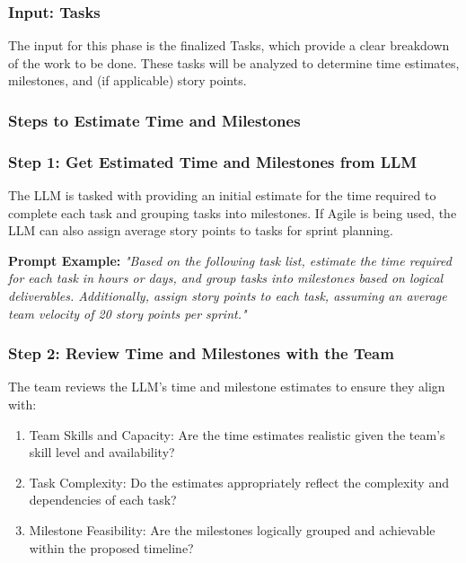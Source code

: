 \documentclass[14pt, a4paper]{article}
\begin{document}
\subsubsection{Input: Tasks}

The input for this phase is the finalized Tasks, which provide a clear breakdown
of the work to be done. These tasks will be analyzed to determine time
estimates, milestones, and (if applicable) story points.

\subsubsection{Steps to Estimate Time and Milestones}

\subsubsection*{Step 1: Get Estimated Time and Milestones from LLM}

The LLM is tasked with providing an initial estimate for the time required to
complete each task and grouping tasks into milestones. If Agile is being used,
the LLM can also assign average story points to tasks for sprint planning.

\textbf{Prompt Example:} \textit{"Based on the following task list, estimate the
time required for each task in hours or days, and group tasks into milestones
based on logical deliverables. Additionally, assign story points to each task,
assuming an average team velocity of 20 story points per sprint."}

\subsubsection*{Step 2: Review Time and Milestones with the Team}

The team reviews the LLM’s time and milestone estimates to ensure they align
with:

\begin{enumerate}
    \item Team Skills and Capacity: Are the time estimates realistic given the
    team's skill level and availability?
    \item Task Complexity: Do the estimates appropriately reflect the complexity
    and dependencies of each task?
    \item Milestone Feasibility: Are the milestones logically grouped and
    achievable within the proposed timeline?
\end{enumerate}
\end{document}
